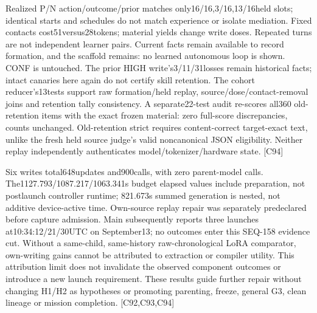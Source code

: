 \documentclass{article}
\begin{document}
Realized P/N action/outcome/prior matches only16/16,3/16,13/16held slots;
identical starts and schedules do not match experience or isolate mediation.
Fixed contacts cost51versus28tokens; material yields change write doses.
Repeated turns are not independent learner pairs. Current facts remain available
to record formation, and the scaffold remains: no learned autonomous loop is
shown. CONF is untouched. The prior HIGH write's3/11/31losses remain historical
facts; intact canaries here again do not certify skill retention. The cohort
reducer's13tests support raw formation/held replay, source/dose/contact-removal
joins and retention tally consistency. A separate22-test audit re-scores all360
old-retention items with the exact frozen material: zero full-score discrepancies,
counts unchanged. Old-retention strict requires content-correct target-exact
text, unlike the fresh held source judge's valid noncanonical JSON eligibility.
Neither replay independently authenticates model/tokenizer/hardware state. [C94]

Six writes total648updates and900calls, with zero parent-model calls.
The1127.793/1087.217/1063.341s budget elapsed values include preparation,
not postlaunch controller runtime;
821.673s summed generation is nested, not additive device-active time.
Own-source replay repair was separately predeclared before capture admission.
Main subsequently reports three launches at10:34:12/21/30UTC on September13;
no outcomes enter this SEQ-158 evidence cut. Without a same-child, same-history
raw-chronological LoRA comparator, own-writing gains cannot be attributed to
extraction or compiler utility. This attribution limit does not invalidate the
observed component outcomes or introduce a new launch requirement.
These results guide further repair without changing H1/H2 as hypotheses or
promoting parenting, freeze, general G3, clean lineage or mission completion.
[C92,C93,C94]
\end{document}
